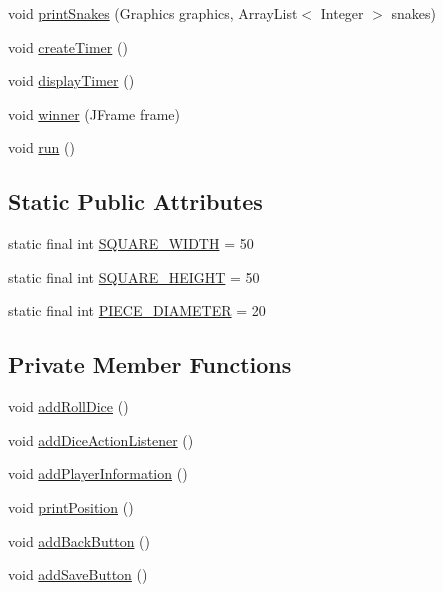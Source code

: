 \begin{DoxyCompactItemize}
\item 
void \hyperlink{class_display_1_1_display_sn_l_ac8d66280626ecf00242f63c0536a144c}{print\+Snakes} (Graphics graphics, Array\+List$<$ Integer $>$ snakes)
\item 
void \hyperlink{class_display_1_1_display_sn_l_a598acd47dc6015f619cc5d89265de10b}{create\+Timer} ()
\item 
void \hyperlink{class_display_1_1_display_sn_l_ab526b124e8678ad26b6ad9c759cdd5d2}{display\+Timer} ()
\item 
void \hyperlink{class_display_1_1_display_sn_l_a232e567bedf12094d4625d6134ff768a}{winner} (J\+Frame frame)
\item 
void \hyperlink{class_display_1_1_display_sn_l_ac95a51c4b09908fc635f2d97fd012ce1}{run} ()
\end{DoxyCompactItemize}
\subsection*{Static Public Attributes}
\begin{DoxyCompactItemize}
\item 
static final int \hyperlink{class_display_1_1_display_sn_l_acac8d594916c09aae69657f94c3e766d}{S\+Q\+U\+A\+R\+E\+\_\+\+W\+I\+D\+T\+H} = 50
\item 
static final int \hyperlink{class_display_1_1_display_sn_l_abcf7150eb19d813f34a1cdd3708d5c83}{S\+Q\+U\+A\+R\+E\+\_\+\+H\+E\+I\+G\+H\+T} = 50
\item 
static final int \hyperlink{class_display_1_1_display_sn_l_ac8f487404183209a60d90af4124eb61c}{P\+I\+E\+C\+E\+\_\+\+D\+I\+A\+M\+E\+T\+E\+R} = 20
\end{DoxyCompactItemize}
\subsection*{Private Member Functions}
\begin{DoxyCompactItemize}
\item 
void \hyperlink{class_display_1_1_display_sn_l_a0a2baf23a90b4ed76b05ef06f5487016}{add\+Roll\+Dice} ()
\item 
void \hyperlink{class_display_1_1_display_sn_l_ab16ef5ed048c34ce2f2973caa9fe2461}{add\+Dice\+Action\+Listener} ()
\item 
void \hyperlink{class_display_1_1_display_sn_l_a1034e2f5f20ba38c25f5b321797f279f}{add\+Player\+Information} ()
\item 
void \hyperlink{class_display_1_1_display_sn_l_a8c5818de472e1cbb43e489bc52f6d5ee}{print\+Position} ()
\item 
void \hyperlink{class_display_1_1_display_sn_l_a5c2c2ebf9f618d9ceaec463352a3a4ff}{add\+Back\+Button} ()
\item 
void \hyperlink{class_display_1_1_display_sn_l_a1b9d580e89e9460efdbe333f8ba849b3}{add\+Save\+Button} ()
\end{DoxyCompactItemize}

